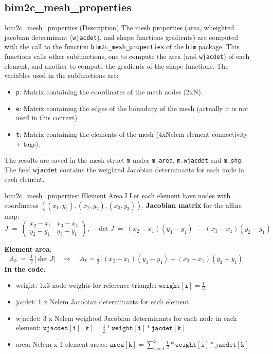 \documentclass[aspectratio=54,xcolor=dvipsnames]{beamer}
\begin{document}
\subsection{bim2c\_mesh\_properties}
\begin{frame}{bim2c\_mesh\_properties (Description)}
    The mesh properties (area, wheighted jacobian determinant (\texttt{wjacdet}), and shape functions gradients) are computed with the call to the function \texttt{bim2c\_mesh\_properties} of the \texttt{bim} package. This functions calls other subfunctions, one to compute the area (and \texttt{wjacdet}) of each element, and another to compute the gradients of the shape functions.
    The variables used in the subfunctions are:
    \begin{itemize}
        \item \texttt{p}: Matrix containing the coordinates of the mesh nodes (2xN).
        \item \texttt{e}: Matrix containing the edges of the boundary of the mesh (actually it is not used in this context)
        \item \texttt{t}: Matrix containing the elements of the mesh (4xNelem element connectivity + tags).
    \end{itemize}
    The results are saved in the mesh struct \texttt{m} under \texttt{m.area}, \texttt{m.wjacdet} and \texttt{m.shg}. The field \texttt{wjacdet} contains the weighted Jacobian determinants for each node in each element.
\end{frame}

\begin{frame}{bim2c\_mesh\_properties: Element Area I}
\small
Let each element have nodes with coordinates $((x_1,y_1), (x_2,y_2), (x_3,y_3))$.
\textbf{Jacobian matrix} for the affine map:
\[
    J \;=\;
    \begin{pmatrix}
        x_2 - x_1 & x_3 - x_1 \\[3pt]
        y_2 - y_1 & y_3 - y_1
    \end{pmatrix},
    \quad
    \det J \;=\;(x_2 - x_1)(y_3 - y_1)\;-\;(x_3 - x_1)(y_2 - y_1)
\]

\textbf{Element area}:
\[
    A_k \;=\;\tfrac12\,|\det J|
    \quad\Longrightarrow\quad
    A_k = \tfrac12\,\bigl|(x_2-x_1)(y_3-y_1)-(x_3-x_1)(y_2-y_1)\bigr|
\]
\textbf{In the code}:
\begin{itemize}
    \item weight: 1x3 node weights for reference triangle: $\mathtt{weight[i]} = \tfrac13$ 
    \item jacdet: 1 x Nelem Jacobian determinants for each element
    \item wjacdet: 3 x Nelem weighted Jacobian determinants for each node in each element: $\mathtt{wjacdet[i][k]} = \tfrac12 * \mathtt{weight[i]} * \mathtt{jacdet[k]}$ 
    \item area: Nelem x 1 element areas: $\mathtt{area[k]} = \sum_{i=1}^{3} \tfrac12 * \mathtt{weight[i]} * \mathtt{jacdet[k]}$
\end{itemize}
\end{frame}
\end{document}
